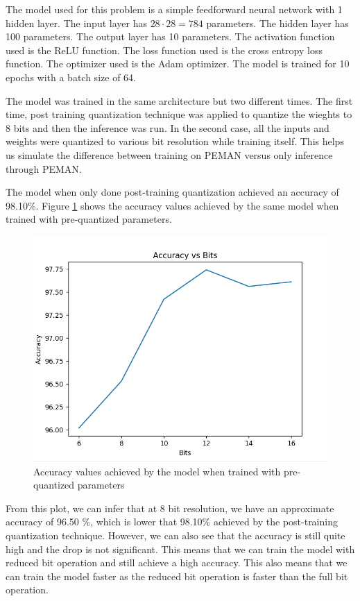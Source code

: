 The model used for this problem is a simple feedforward neural network with 1 hidden layer. The input layer has $28 \cdot 28 = 784$ parameters. The hidden layer has 100 parameters. The output layer has 10 parameters. The activation function used is the ReLU function. The loss function used is the cross entropy loss function. The optimizer used is the Adam optimizer. The model is trained for 10 epochs with a batch size of 64.

The model was trained in the same architecture but two different times. The first time, post training quantization technique was applied to quantize the wieghts to 8 bits and then the inference was run. In the second case, all the inputs and weights were quantized to various bit resolution while training itself. This helps us simulate the difference between training on PEMAN versus only inference through PEMAN.

The model when only done post-training quantization achieved an accuracy of 98.10\%. Figure \ref{trainingOnPeman} shows the accuracy values achieved by the same model when trained with pre-quantized parameters.

\begin{figure}
	\centering
	\includegraphics[width=\textwidth]{images/trainingOnPeman.png}
	\caption{Accuracy values achieved by the model when trained with pre-quantized parameters}
	\label{trainingOnPeman}
\end{figure}

From this plot, we can infer that at 8 bit resolution, we have an approximate accuracy of 96.50 \%, which is lower that 98.10\% achieved by the post-training quantization technique. However, we can also see that the accuracy is still quite high and the drop is not significant. This means that we can train the model with reduced bit operation and still achieve a high accuracy. This also means that we can train the model faster as the reduced bit operation is faster than the full bit operation.

